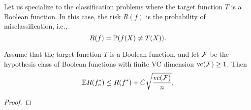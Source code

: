 Let us specialize to the classification problems where the target function \(T\) is a Boolean function. In this case, the risk \(R(f)\) is the probability of misclassification, i.e.,
\begin{equation*}
    R(f)={\mathbb P}(f(X)\neq T(X)).
\end{equation*}

\begin{theorem}
    Assume that the target function \(T\) is a Boolean function, and let \({\mathcal F}\) be the hypothesis class of Boolean functions with finite VC dimension \(\text{vc}({\mathcal F})\geq 1\). Then
    \begin{equation*}
        {\mathbb E} R(f_{n}^{*})\leq R(f^{*})+C\sqrt{\frac{\text{vc}({\mathcal F})}{n}},
    \end{equation*}
\end{theorem}

\begin{proof}
    
\end{proof}